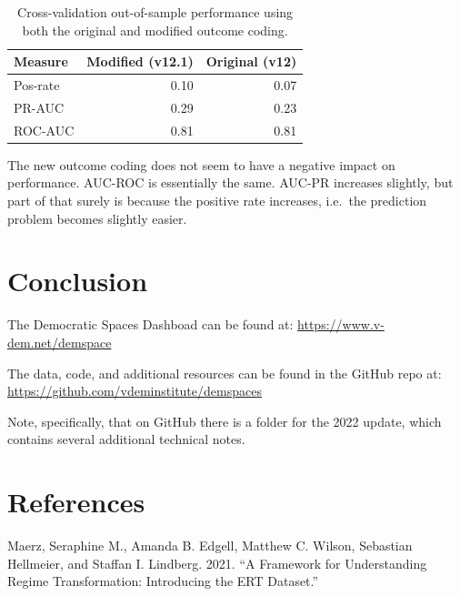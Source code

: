 \documentclass[
  11pt,
]{article}
\newlength{\cslhangindent}
\newlength{\cslentryspacingunit} %
\newenvironment{CSLReferences}[2] %
 {%
  \setlength{\parindent}{0pt}
  \ifodd #1
  \let\oldpar\par
  \def\par{\hangindent=\cslhangindent\oldpar}
  \fi
  \setlength{\parskip}{#2\cslentryspacingunit}
 }%
 {}
\begin{document}
\begin{table}
\centering
\caption{Cross-validation out-of-sample performance using both the original and modified outcome coding.\label{tab:cv-results}}
\begin{tabular}{lrr}
\toprule
Measure & Modified (v12.1) & Original (v12) \\
\midrule
Pos-rate & 0.10 & 0.07\\
PR-AUC & 0.29 & 0.23\\
ROC-AUC & 0.81 & 0.81\\
\bottomrule
\end{tabular}
\end{table}

The new outcome coding does not seem to have a negative impact on
performance. AUC-ROC is essentially the same. AUC-PR increases slightly,
but part of that surely is because the positive rate increases, i.e.~the
prediction problem becomes slightly easier.

\hypertarget{conclusion}{%
\section{Conclusion}\label{conclusion}}

The Democratic Spaces Dashboad can be found at:
\url{https://www.v-dem.net/demspace}

The data, code, and additional resources can be found in the GitHub repo
at: \url{https://github.com/vdeminstitute/demspaces}

Note, specifically, that on GitHub there is a folder for the 2022
update, which contains several additional technical notes.

\hypertarget{references}{%
\section*{References}\label{references}}

\hypertarget{refs}{}
\begin{CSLReferences}{1}{0}
\leavevmode{}%
Maerz, Seraphine M., Amanda B. Edgell, Matthew C. Wilson, Sebastian
Hellmeier, and Staffan I. Lindberg. 2021. {``A Framework for
Understanding Regime Transformation: Introducing the ERT Dataset.''}

\end{CSLReferences}
\end{document}
